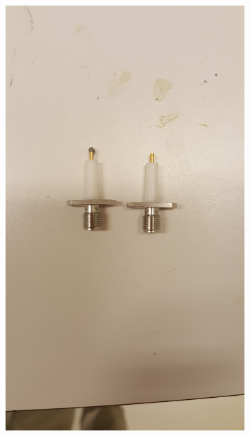 \documentclass[main.tex]{subfiles}
\begin{document}
\begin{figure}[h]
  
    \begin{subfigure}{0.329\textwidth}
        \centering
        \includegraphics[angle=-90,trim=1200 100 1800 100,clip,width=0.97\linewidth]{figure/Filterbilder/prep_SMA.jpg} 
        \caption{}
        \label{fig:prep_SMA}
    \end{subfigure}
    \begin{subfigure}{0.329\textwidth}
        \centering

\end{subfigure}
\end{figure}
\end{document}
